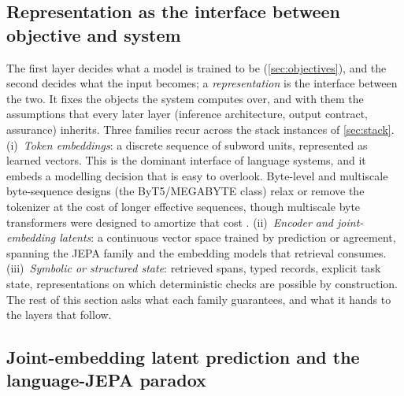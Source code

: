 
\subsection{Representation as the interface between objective and system}
\label{sec:l2-interface}

The first layer decides what a model is trained to be (\cref{sec:objectives}), and the second
decides what the input becomes; a \emph{representation} is the interface between the two. It
fixes the objects the system computes over, and with them the assumptions that every later layer
(inference architecture, output contract, assurance) inherits. Three families recur across the
stack instances of \cref{sec:stack}. (i)~\emph{Token embeddings}: a discrete sequence of subword
units, represented as learned vectors. This is the dominant interface of language systems, and
it embeds a modelling decision that is easy to overlook. 
Byte-level and multiscale byte-sequence designs (the ByT5/MEGABYTE class) relax or remove the
tokenizer at the cost of longer effective sequences, though multiscale byte transformers were
designed to amortize that cost \cite{id230507185}.
(ii)~\emph{Encoder and joint-embedding latents}: a continuous vector space trained by prediction
or agreement, spanning the JEPA family and the embedding models that retrieval consumes.
(iii)~\emph{Symbolic or structured state}: retrieved spans, typed records, explicit task state,
representations on which deterministic checks are possible by construction. The rest of this
section asks what each family guarantees, and what it hands to the layers that follow.

\subsection{Joint-embedding latent prediction and the language-{JEPA} paradox}
\label{sec:l2-jepa}

